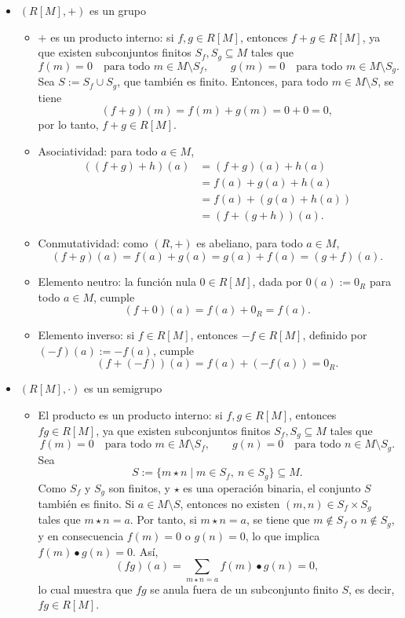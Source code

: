 \begin{itemize}
	
	\item \( (R[M], +) \) es un grupo
	\begin{itemize}
		\item \( + \) es un producto interno: si \( f, g \in R[M] \), entonces \( f + g \in R[M] \), ya que existen subconjuntos finitos \( S_f, S_g \subseteq M \) tales que
		\[
		f(m) = 0 \quad \text{para todo } m \in M \setminus S_f,
		\qquad
		g(m) = 0 \quad \text{para todo } m \in M \setminus S_g.
		\]
		Sea \( S := S_f \cup S_g \), que también es finito. Entonces, para todo \( m \in M \setminus S \), se tiene
		\[
		(f + g)(m) = f(m) + g(m) = 0 + 0 = 0,
		\]
		por lo tanto, \( f + g \in R[M] \).
		
	
		
		\item Asociatividad: para todo \( a \in M \),
		\begin{align*}
			((f + g) + h)(a) 
			&= (f + g)(a) + h(a) \\
			&= f(a) + g(a) + h(a) \\
			&= f(a) + (g(a) + h(a)) \\
			&= (f + (g + h))(a). 
		\end{align*}

		\item Conmutatividad: como \( (R, +) \) es abeliano, para todo \( a \in M \),
		\[
		(f + g)(a) = f(a) + g(a) = g(a) + f(a) = (g + f)(a).
		\]
		
		\item Elemento neutro: la función nula \( 0 \in R[M] \), dada por \( 0(a) := 0_R \) para todo \( a \in M \), cumple
		\[
		(f + 0)(a) = f(a) + 0_R = f(a).
		\]
		
		\item Elemento inverso: si \( f \in R[M] \), entonces \( -f \in R[M] \), definido por \( (-f)(a) := -f(a) \), cumple
		\[
		(f + (-f))(a) = f(a) + (-f(a)) = 0_R.
		\]
	\end{itemize}
	
	\item \( (R[M], \cdot) \) es un semigrupo
	\begin{itemize}
		\item El producto es un producto interno: si \( f, g \in R[M] \), entonces \( fg \in R[M] \), ya que existen subconjuntos finitos \( S_f, S_g \subseteq M \) tales que
		\[
		f(m) = 0 \quad \text{para todo } m \in M \setminus S_f,
		\qquad
		g(n) = 0 \quad \text{para todo } n \in M \setminus S_g.
		\]
		Sea
		\[
		S := \{ m \star n \mid m \in S_f,\ n \in S_g \} \subseteq M.
		\]
		Como \( S_f \) y \( S_g \) son finitos, y \( \star \) es una operación binaria, el conjunto \( S \) también es finito. Si \( a \in M \setminus S \), entonces no existen \( (m, n) \in S_f \times S_g \) tales que \( m \star n = a \). Por tanto, si \( m \star n = a \), se tiene que \( m \notin S_f \) o \( n \notin S_g \), y en consecuencia \( f(m) = 0 \) o \( g(n) = 0 \), lo que implica \( f(m) \bullet g(n) = 0 \). Así,
		\[
		(fg)(a) = \sum_{m \star n = a} f(m) \bullet g(n) = 0,
		\]
		lo cual muestra que \( fg \) se anula fuera de un subconjunto finito \( S \), es decir, \( fg \in R[M] \).
		

\end{itemize}
\end{itemize}
